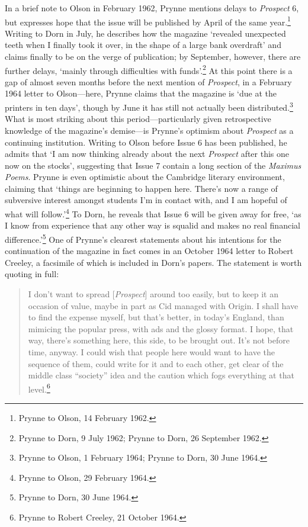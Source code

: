 \documentclass[]{article}
\begin{document}
In a brief note to Olson in February 1962, Prynne mentions delays to
\emph{Prospect} 6, but expresses hope that the issue will be published
by April of the same year.\footnote{Prynne to Olson, 14 February 1962.}
Writing to Dorn in July, he describes how the magazine ‘revealed
unexpected teeth when I finally took it over, in the shape of a large
bank overdraft’ and claims finally to be on the verge of publication; by
September, however, there are further delays, ‘mainly through
difficulties with funds’.\footnote{Prynne to Dorn, 9 July 1962; Prynne
  to Dorn, 26 September 1962.} At this point there is a gap of almost
seven months before the next mention of \emph{Prospect}, in a February
1964 letter to Olson—here, Prynne claims that the magazine is ‘due at
the printers in ten days’, though by June it has still not actually been
distributed.\footnote{Prynne to Olson, 1 February 1964; Prynne to Dorn,
  30 June 1964.} What is most striking about this period—particularly
given retrospective knowledge of the magazine’s demise—is Prynne’s
optimism about \emph{Prospect} as a continuing institution. Writing to
Olson before Issue 6 has been published, he admits that ‘I am now
thinking already about the next \emph{Prospect} after this one now on
the stocks’, suggesting that Issue 7 contain a long section of the
\emph{Maximus Poems}. Prynne is even optimistic about the Cambridge
literary environment, claiming that ‘things are beginning to happen
here. There’s now a range of subversive interest amongst students I’m in
contact with, and I am hopeful of what will follow.’\footnote{Prynne to
  Olson, 29 February 1964.} To Dorn, he reveals that Issue 6 will be
given away for free, ‘as I know from experience that any other way is
squalid and makes no real financial difference.’\footnote{Prynne to
  Dorn, 30 June 1964.} One of Prynne’s clearest statements about his
intentions for the continuation of the magazine in fact comes in an
October 1964 letter to Robert Creeley, a facsimile of which is included
in Dorn’s papers. The statement is worth quoting in full:

\begin{quote}
\singlespacing I don’t want to spread {[}\emph{Prospect}{]} around too
easily, but to keep it an occasion of value, maybe in part as Cid
managed with Origin. I shall have to find the expense myself, but that’s
better, in today’s England, than mimicing the popular press, with ads
and the glossy format. I hope, that way, there’s something here, this
side, to be brought out. It’s not before time, anyway. I could wish that
people here would want to have the sequence of them, could write for it
and to each other, get clear of the middle class “society” idea and the
caution which fogs everything at that level.\footnote{Prynne to Robert
  Creeley, 21 October 1964.}
\end{quote}
\end{document}
